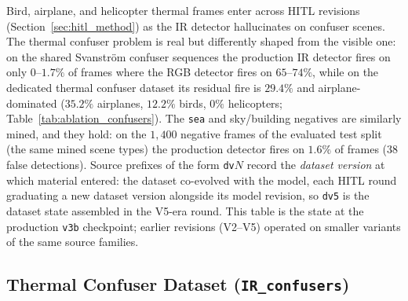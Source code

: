 Bird, airplane, and helicopter thermal frames enter across HITL revisions (Section~\ref{sec:hitl_method}) as the IR detector hallucinates on confuser scenes. The thermal confuser problem is real but differently shaped from the visible one: on the shared Svanstr\"om confuser sequences the production IR detector fires on only $0$--$1.7\%$ of frames where the RGB detector fires on $65$--$74\%$, while on the dedicated thermal confuser dataset its residual fire is $29.4\%$ and airplane-dominated ($35.2\%$ airplanes, $12.2\%$ birds, $0\%$ helicopters; Table~\ref{tab:ablation_confusers}). The \texttt{sea} and sky/building negatives are similarly mined, and they hold: on the $1{,}400$ negative frames of the evaluated test split (the same mined scene types) the production detector fires on $1.6\%$ of frames ($38$ false detections). Source prefixes of the form \texttt{dv$N$} record the \emph{dataset version} at which material entered: the dataset co-evolved with the model, each HITL round graduating a new dataset version alongside its model revision, so \texttt{dv5} is the dataset state assembled in the V5-era round. This table is the state at the production \texttt{v3b} checkpoint; earlier revisions (V2--V5) operated on smaller variants of the same source families.

\subsection{Thermal Confuser Dataset (\texttt{IR\_confusers})}
\label{sec:ds_ir_confusers}

